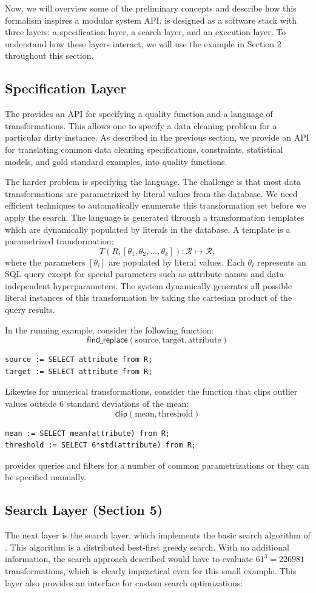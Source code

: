Now, we will overview some of the preliminary concepts and describe how this formalism inspires a modular system API.
\sys is designed as a software stack with three layers: a specification layer, a search layer, and an execution layer.
To understand how these layers interact, we will use the example in Section 2 throughout this section.


\subsection{Specification Layer} The provides an API for specifying a quality function and a language of transformations. This allows one to specify a data cleaning problem for a particular dirty instance. As described in the previous section, we provide an API for translating common data cleaning specifications, constraints, statistical models, and gold standard examples, into quality functions. 

The harder problem is specifying the language. 
The challenge is that most data transformations are parametrized by literal values from the database.
We need efficient techniques to automatically enumerate this transformation set before we apply the search.
The language is generated through a transformation templates which are dynamically populated by literals in the database.
A template is a parametrized transformation:
\[T(R, [\theta_1, \theta_2,...,\theta_k] ): \mathcal{R} \mapsto  \mathcal{R},\] where the parameters $[\theta_i]$ are populated by literal values.
Each $\theta_i$ represents an SQL query except for special parameters such as attribute names and data-independent hyperparameters.
The system dynamically generates all possible literal instances of this transformation by taking the cartesian product of the query results.

In the running example, consider the following function:
\[
\textsf{find\_replace}(\text{source}, \text{target}, \text{attribute})
\]
\begin{lstlisting}
source := SELECT attribute from R;
target := SELECT attribute from R;
\end{lstlisting}
Likewise for numerical transformations, consider the function that clips outlier values outside 6 standard deviations of the mean:
\[
\textsf{clip}(\text{mean}, \text{threshold})
\]
\begin{lstlisting}
mean := SELECT mean(attribute) from R;
threshold := SELECT 6*std(attribute) from R;
\end{lstlisting}
\sys provides queries and filters for a number of common parametrizations or they can be specified manually.

\subsection{Search Layer (Section 5)} The next layer is the search layer, which implements the basic search algorithm of \sys. This algorithm is a distributed best-first greedy search.  
With no additional information, the search approach described would have to evaluate $61^3 = 226981$ transformations, which is clearly impractical even for this small example.
This layer also provides an interface for custom search optimizations:

\fi
